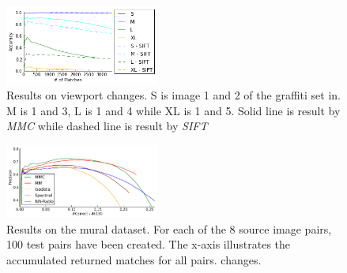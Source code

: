 \documentclass[12pt,journal,compsoc]{IEEEtran}
\begin{document}
%
\begin{figure}
	\centering
	\includegraphics[width=0.45\textwidth]{images/result_viewport}
	\caption{Results on viewport changes. S is image 1 and 2 of the 
	graffiti set in\cite{mikolajczyk2005performance}. M is 1 and 3, L is 
1 and 4 while XL is 1 and 5. Solid line is result by \emph{MMC} while 
dashed line is result by \emph{SIFT}}
	\label{fig:result_viewport}
\end{figure}
\begin{figure}
	\centering
	\includegraphics[width=0.45\textwidth]{images/result_accumulated}
	\caption{Results on the mural dataset. For each of the 8 source 
		image pairs, 100 test pairs have been created. The x-axis 
		illustrates the accumulated returned matches for all pairs.
		changes.}
	\label{fig:result_accumulated}
\end{figure}
\end{document}
